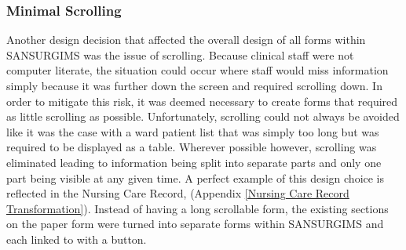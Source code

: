 \newpage
\subsubsection{Minimal Scrolling}
Another design decision that affected the overall design of all forms within SANSURGIMS was the issue of scrolling. Because clinical staff were not computer literate, the situation could occur where staff would miss information simply because it was further down the screen and required scrolling down. In order to mitigate this risk, it was deemed necessary to create forms that required as little scrolling as possible. Unfortunately, scrolling could not always be avoided like it was the case with a ward patient list that was simply too long but was required to be displayed as a table. Wherever possible however, scrolling was eliminated leading to information being split into separate parts and only one part being visible at any given time. A perfect example of this design choice is reflected in the Nursing Care Record, (Appendix \ref{Nursing Care Record Transformation}). Instead of having a long scrollable form, the existing sections on the paper form were turned into separate forms within SANSURGIMS and each linked to with a button.

